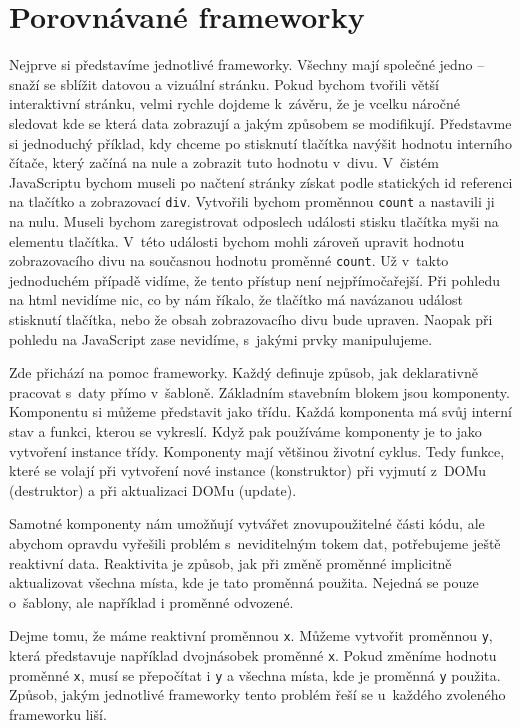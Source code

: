 \documentclass[
  master,
  program=ainf,
  tables=false,
  sourcecodes,
  glossaries,
  index
]{kidiplom}
\begin{document}
\newpage
\section{Porovnávané frameworky}
Nejprve si představíme jednotlivé frameworky. Všechny mají společné jedno --
snaží se sblížit datovou a vizuální stránku. Pokud bychom tvořili větší
interaktivní stránku, velmi rychle dojdeme k~závěru, že je vcelku náročné
sledovat kde se která data zobrazují a jakým způsobem se modifikují. Představme
si jednoduchý příklad, kdy chceme po stisknutí tlačítka navýšit hodnotu
interního čítače, který začíná na nule a zobrazit tuto hodnotu v~divu. V~čistém
JavaScriptu \cite{js} bychom museli po načtení stránky získat podle statických id
referenci na tlačítko a zobrazovací {\tt div}. Vytvořili bychom proměnnou {\tt count} a
nastavili ji na nulu. Museli bychom zaregistrovat odposlech události stisku
tlačítka myši na elementu tlačítka. V~této události bychom mohli zároveň
upravit hodnotu zobrazovacího divu na současnou hodnotu proměnné {\tt count}. Už
v~takto jednoduchém případě vidíme, že tento přístup není nejpřímočařejší.
Při pohledu na html nevidíme nic, co by nám říkalo, že tlačítko má navázanou
událost stisknutí tlačítka, nebo že obsah zobrazovacího divu bude upraven.
Naopak při pohledu na JavaScript \cite{js} zase nevidíme, s~jakými prvky manipulujeme.

Zde přichází na pomoc frameworky. Každý definuje způsob, jak deklarativně
pracovat s~daty přímo v~šabloně. Základním stavebním blokem jsou komponenty.
Komponentu si můžeme představit jako třídu. Každá komponenta má svůj interní
stav a funkci, kterou se vykreslí. Když pak používáme komponenty je to jako
vytvoření instance třídy. Komponenty mají většinou životní cyklus. Tedy funkce,
které se volají při vytvoření nové instance (konstruktor) při vyjmutí z~DOMu
(destruktor) a při aktualizaci DOMu (update).

Samotné komponenty nám umožňují vytvářet znovupoužitelné části kódu, ale
abychom opravdu vyřešili problém s~neviditelným tokem dat, potřebujeme ještě
reaktivní data. Reaktivita je způsob, jak při změně proměnné implicitně
aktualizovat všechna místa, kde je tato proměnná použita. Nejedná se pouze
o~šablony, ale například i proměnné odvozené. 

Dejme tomu, že máme reaktivní proměnnou {\tt x}. Můžeme vytvořit proměnnou {\tt y}, která
představuje například dvojnásobek proměnné {\tt x}. Pokud změníme hodnotu proměnné {\tt x},
musí se přepočítat i {\tt y} a všechna místa, kde je proměnná {\tt y} použita. Způsob, jakým
jednotlivé frameworky tento problém řeší se u~každého zvoleného frameworku liší.
\end{document}
